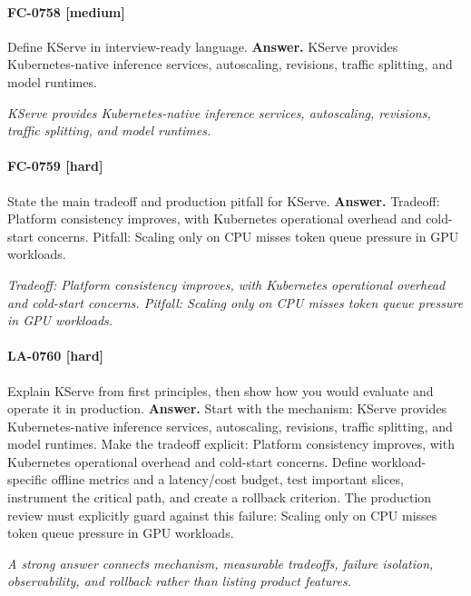 \paragraph{FC-0758 [medium]} Define KServe in interview-ready language.
\noindent\textbf{Answer.} KServe provides Kubernetes-native inference services, autoscaling, revisions, traffic splitting, and model runtimes.
\par\textit{KServe provides Kubernetes-native inference services, autoscaling, revisions, traffic splitting, and model runtimes.}
\paragraph{FC-0759 [hard]} State the main tradeoff and production pitfall for KServe.
\noindent\textbf{Answer.} Tradeoff: Platform consistency improves, with Kubernetes operational overhead and cold-start concerns. Pitfall: Scaling only on CPU misses token queue pressure in GPU workloads.
\par\textit{Tradeoff: Platform consistency improves, with Kubernetes operational overhead and cold-start concerns. Pitfall: Scaling only on CPU misses token queue pressure in GPU workloads.}
\paragraph{LA-0760 [hard]} Explain KServe from first principles, then show how you would evaluate and operate it in production.
\noindent\textbf{Answer.} Start with the mechanism: KServe provides Kubernetes-native inference services, autoscaling, revisions, traffic splitting, and model runtimes. Make the tradeoff explicit: Platform consistency improves, with Kubernetes operational overhead and cold-start concerns. Define workload-specific offline metrics and a latency/cost budget, test important slices, instrument the critical path, and create a rollback criterion. The production review must explicitly guard against this failure: Scaling only on CPU misses token queue pressure in GPU workloads.
\par\textit{A strong answer connects mechanism, measurable tradeoffs, failure isolation, observability, and rollback rather than listing product features.}
